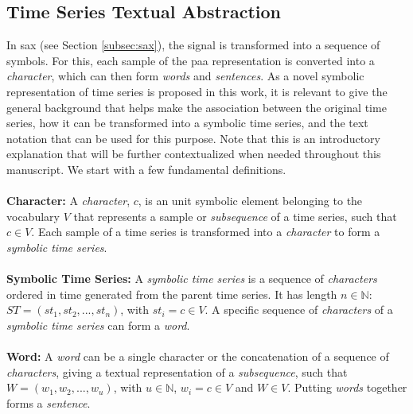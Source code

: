 
\subsection{Time Series Textual Abstraction}
\label{subsec:text_abstraction}

In \gls{sax} (see Section \ref{subsec:sax}), the signal is transformed into a sequence of symbols. For this, each sample of the \gls{paa} representation is converted into a \textit{character}, which can then form \textit{words} and \textit{sentences}. As a novel symbolic representation of time series is proposed in this work, it is relevant to give the general background that helps make the association between the original time series, how it can be transformed into a symbolic time series, and the text notation that can be used for this purpose. Note that this is an introductory explanation that will be further contextualized when needed throughout this manuscript. We start with a few fundamental definitions.\\\\
\textbf{Character:} A \textit{character}, $c$, is an unit symbolic element belonging to the vocabulary $V$ that represents a sample or \textit{subsequence} of a time series, such that $c \in V$. Each sample of a time series is transformed into a \textit{character} to form a \textit{symbolic time series}.\\\\
\textbf{Symbolic Time Series:} A \textit{symbolic time series} is a sequence of \textit{characters} ordered in time generated from the parent time series. It has length $n \in \mathbb{N}$: $ST = (st_1, st_2, ..., st_n)$, with $st_i = c \in V$. A specific sequence of \textit{characters} of a \textit{symbolic time series} can form a \textit{word}.\\\\
\textbf{Word:} A \textit{word} can be a single character or the concatenation of a sequence of \textit{characters}, giving a textual representation of a \textit{subsequence}, such that $W = (w_1, w_2, ..., w_u)$, with $u \in \mathbb{N}$, $w_i = c \in V$ and $W \in V$. Putting \textit{words} together forms a \textit{sentence}.\\\\
